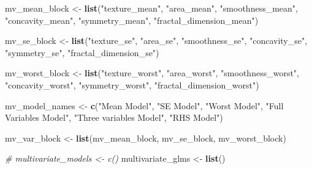 \documentclass[
]{article}
\newenvironment{Shaded}{\begin{snugshade}}{\end{snugshade}}
\newcommand{\CommentTok}[1]{\textcolor[rgb]{0.56,0.35,0.01}{\textit{#1}}}
\newcommand{\KeywordTok}[1]{\textcolor[rgb]{0.13,0.29,0.53}{\textbf{#1}}}
\newcommand{\NormalTok}[1]{#1}
\newcommand{\StringTok}[1]{\textcolor[rgb]{0.31,0.60,0.02}{#1}}
\begin{document}
\begin{Shaded}
\begin{Highlighting}[]
\NormalTok{mv_mean_block <-}\StringTok{ }\KeywordTok{list}\NormalTok{(}\StringTok{"texture_mean"}\NormalTok{, }\StringTok{"area_mean"}\NormalTok{, }\StringTok{"smoothness_mean"}\NormalTok{,}
                      \StringTok{"concavity_mean"}\NormalTok{, }\StringTok{"symmetry_mean"}\NormalTok{, }
                      \StringTok{"fractal_dimension_mean"}\NormalTok{)}

\NormalTok{mv_se_block <-}\StringTok{ }\KeywordTok{list}\NormalTok{(}\StringTok{"texture_se"}\NormalTok{, }\StringTok{"area_se"}\NormalTok{, }\StringTok{"smoothness_se"}\NormalTok{, }\StringTok{"concavity_se"}\NormalTok{,}
                       \StringTok{"symmetry_se"}\NormalTok{, }\StringTok{"fractal_dimension_se"}\NormalTok{)}

\NormalTok{mv_worst_block <-}\StringTok{ }\KeywordTok{list}\NormalTok{(}\StringTok{"texture_worst"}\NormalTok{, }\StringTok{"area_worst"}\NormalTok{, }\StringTok{"smoothness_worst"}\NormalTok{,}
                       \StringTok{"concavity_worst"}\NormalTok{, }\StringTok{"symmetry_worst"}\NormalTok{, }
                       \StringTok{"fractal_dimension_worst"}\NormalTok{)}

\NormalTok{mv_model_names <-}\StringTok{ }\KeywordTok{c}\NormalTok{(}\StringTok{"Mean Model"}\NormalTok{, }\StringTok{"SE Model"}\NormalTok{, }\StringTok{"Worst Model"}\NormalTok{, }
                    \StringTok{"Full Variables Model"}\NormalTok{, }\StringTok{"Three variables Model"}\NormalTok{, }
                    \StringTok{"RHS Model"}\NormalTok{)}

\NormalTok{mv_var_block <-}\StringTok{ }\KeywordTok{list}\NormalTok{(mv_mean_block, mv_se_block, mv_worst_block)}

\CommentTok{# multivariate_models <- c()}
\NormalTok{multivariate_glms <-}\StringTok{ }\KeywordTok{list}\NormalTok{()}


\end{Highlighting}
\end{Shaded}
\end{document}
